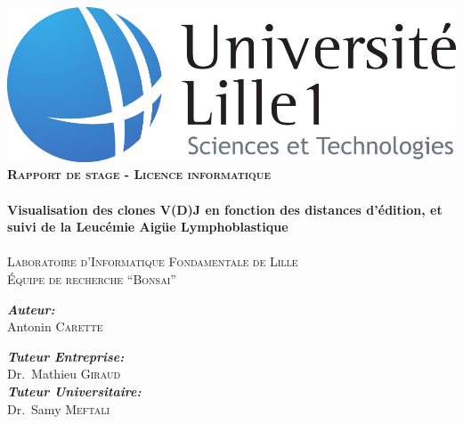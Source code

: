 \begin{titlepage}
\begin{center}

\includegraphics[scale=0.25]{img/logo-lille1.jpg}\\[2.5cm]


\textsc{\Large \bfseries Rapport de stage - Licence informatique}\\[0.5cm]

\HRule \\[0.5cm]
{ \Large \bfseries Visualisation des clones V(D)J en fonction des distances d'édition, et suivi de la Leucémie Aigüe Lymphoblastique \\[0.5cm]}
\HRule \\[0.5cm]

\textsc{\large Laboratoire d'Informatique Fondamentale de Lille \\ Équipe de recherche ``Bonsai''}\\[2cm]

\begin{minipage}{0.4\textwidth}
\begin{flushleft} \large
\emph{\bfseries Auteur:}\\
Antonin \textsc{Carette}
\end{flushleft}
\end{minipage}
\begin{minipage}{0.4\textwidth}
\begin{flushright} \large
\emph{\bfseries Tuteur Entreprise:} \\
Dr.~Mathieu \textsc{Giraud}\\[0.2cm]
\emph{\bfseries Tuteur Universitaire:} \\
Dr.~Samy \textsc{Meftali}
\end{flushright}
\end{minipage}

\vfill


\end{center}
\end{titlepage}
